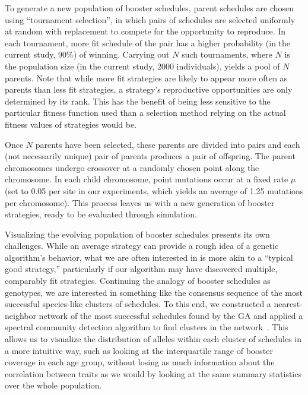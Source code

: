\documentclass[12pt]{article}
\begin{document}
To generate a new population of booster schedules, 
parent schedules are chosen using ``tournament selection''\cite{Goldberg&Kalyanmoy:1991},
in which pairs of schedules are selected uniformly
at random with replacement 
to compete for the opportunity to reproduce.
In each tournament, more fit schedule of the pair has a higher probability 
(in the current study, 90\%) of winning.
Carrying out $N$ such tournaments,
where $N$ is the population size (in the current study, 2000 individuals), yields a pool of $N$ parents.
Note that while more fit strategies are likely to appear more often
as parents than less fit strategies, a strategy's reproductive opportunities
are only determined by its rank.
This has the benefit of being less sensitive to the particular fitness function
used than a selection method relying on the actual fitness values of strategies
would be.

Once $N$ parents have been selected, these parents are divided into pairs and 
each (not necessarily unique) pair of parents 
produces a pair of offspring.
The parent chromosomes undergo 
crossover at a randomly chosen point
along the chromosome.
In each child chromosome,
point mutations occur at a fixed rate $\mu$ 
(set to 0.05 per site in our experiments,
which yields an average of 1.25 mutations per chromosome).
This process leaves us with a new generation of booster strategies, 
ready to be evaluated through simulation.

Visualizing the evolving population of booster schedules presents its own challenges.
While an average strategy can provide a rough idea of a genetic algorithm's behavior,
what we are often interested in is more akin to a ``typical good strategy,''
particularly if our algorithm may have discovered multiple, comparably fit strategies.
Continuing the analogy of booster schedules as genotypes,
we are interested in something like the consensus sequence of the most successful
species-like clusters of schedules. 
To this end, we constructed a nearest-neighbor
network of the most successful schedules found by the GA
and applied a spectral community detection algorithm 
to find clusters in the network~\cite{Riolo&Newman:2012}.
This allows us to visualize
the distribution of alleles within each cluster of schedules
in a more intuitive way, such as looking at the 
interquartile range of booster coverage in each age group,
without losing as much information about the correlation between traits
as we would by looking at the same summary statistics over the whole population.
\end{document}
